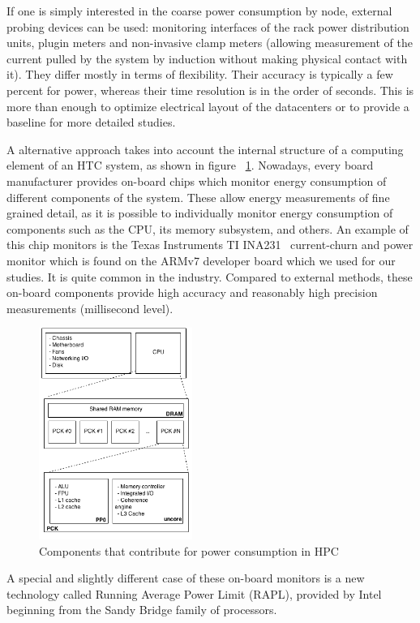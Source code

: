 If one is simply interested in the coarse power consumption by node,
external probing devices can be used: monitoring interfaces
of the rack power distribution units, plugin meters and non-invasive
clamp meters (allowing measurement of the
current pulled by the system by induction without making physical
contact with it). They differ mostly in terms of flexibility.
Their accuracy is typically a few percent for power, whereas their time
resolution is in the order of seconds. This is more than enough
to optimize electrical layout of the datacenters or to provide a
baseline for more detailed studies.

A alternative approach takes into account the internal structure of a
computing element of an HTC system, as shown in figure 
~\ref{fig:power-consumption-model}. Nowadays, every board manufacturer
provides on-board chips which monitor energy consumption of
different components of the system. These
allow energy measurements of fine grained detail, as it is possible
to individually monitor energy consumption of components such as
the CPU, its memory subsystem, and others. An example of this chip
monitors is the Texas Instruments TI INA231~\cite{TIINA231} current-churn
and power monitor which is found on the ARMv7 developer board which
we used for our studies. It is quite common in the industry.
Compared to external methods, these on-board components provide
high accuracy and reasonably high precision measurements (millisecond
level).

\begin{figure}[tbp]
\centering
\includegraphics[width=50mm]{img/energy_model.png}
\caption{Components that contribute for power consumption in HPC}
\label{fig:power-consumption-model}
\end{figure}

A special and slightly different case of these on-board monitors
is a new technology called Running Average Power Limit (RAPL),
provided by Intel beginning from the Sandy Bridge family of processors.

